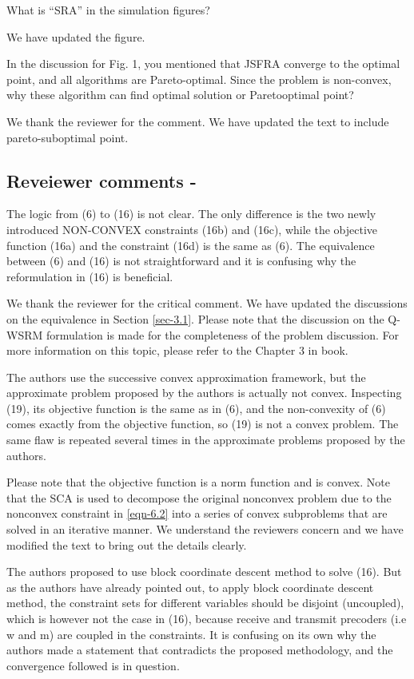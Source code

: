  What is “SRA” in the simulation figures?

\resp We have updated the figure.

 In the discussion for Fig. 1, you mentioned that JSFRA converge to the optimal point, and all algorithms are Pareto-optimal. Since the problem is non-convex, why these algorithm can find optimal solution or Paretooptimal point? 

\resp We thank the reviewer for the comment. We have updated the text to include pareto-suboptimal point.


\subsection*{Reveiewer comments - }

 The logic from (6) to (16) is not clear. The only difference is the two newly introduced NON-CONVEX constraints (16b) and (16c), while the objective function (16a) and the constraint (16d) is the same as (6). The equivalence between (6) and (16) is not straightforward and it is confusing why the reformulation in (16) is beneficial.

\resp We thank the reviewer for the critical comment. We have updated the discussions on the equivalence in Section \ref{sec-3.1}. Please note that the discussion on the \ac{Q-WSRM} formulation is made for the completeness of the problem discussion. For more information on this topic, please refer to the Chapter 3 in \cite{neely2010stochastic} book.

 The authors use the successive convex approximation framework, but the approximate problem proposed by the authors is actually not convex. Inspecting (19), its objective function is the same as in (6), and the non-convexity of (6) comes exactly from the objective function, so (19) is not a convex problem. The same flaw is repeated several times in the approximate problems proposed by the authors.

\resp Please note that the objective function is a norm function and is convex. Note that the \ac{SCA} is used to decompose the original nonconvex problem due to the nonconvex constraint in \eqref{eqn-6.2} into a series of convex subproblems that are solved in an iterative manner. We understand the reviewers concern and we have modified the text to bring out the details clearly.

 The authors proposed to use block coordinate descent method to solve (16). But as the authors have already pointed out, to apply block coordinate descent method, the constraint sets for different variables should be disjoint (uncoupled), which is however not the case in (16), because receive and transmit precoders (i.e w and m) are coupled in the constraints. It is confusing on its own why the authors made a statement that contradicts the proposed methodology, and the convergence followed is in question.

